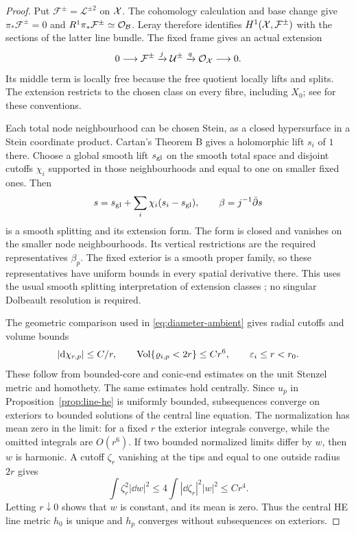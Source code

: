 \begin{proof}
Put $\mathcal F^\pm=\mathcal L^{\pm2}$ on $\mathcal X$.
The cohomology calculation and base change give
$\pi_*\mathcal F^\pm=0$ and $R^1\pi_*\mathcal F^\pm\simeq\mathcal O_{\mathcal B}$.
Leray therefore identifies $H^1(\mathcal X,\mathcal F^\pm)$ with
the sections of the latter line bundle. The fixed frame gives
an actual extension
\begin{equation}\label{eq:total-extension}
 0\longrightarrow\mathcal F^\pm\xrightarrow{j}
 \mathcal U^\pm\xrightarrow{q}\mathcal O_{\mathcal X}\longrightarrow0.
\end{equation}
Its middle term is locally free because the free quotient
locally lifts and splits. The extension restricts to the
chosen class on every fibre, including $X_0$;
see \cite[Tags 01F2 and 0B3A]{Stacks} for these conventions.

Each total node neighbourhood can be chosen Stein, as a
closed hypersurface in a Stein coordinate product. Cartan's
Theorem B \cite[exposé 18, p.~18-7; exposé 19, Section 5]{Cartan}
gives a holomorphic lift $s_i$ of $1$ there.
Choose a global smooth lift $s_{\rm gl}$ on the smooth total
space and disjoint cutoffs $\chi_i$ supported in those
neighbourhoods and equal to one on smaller fixed ones.
Then
\[
 s=s_{\rm gl}+\sum_i\chi_i(s_i-s_{\rm gl}),\qquad
                      \beta=j^{-1}\bar\partial s
\]
is a smooth splitting and its extension form. The form is
closed and vanishes on the smaller node neighbourhoods.
Its vertical restrictions are the required representatives
$\beta_p$. The fixed exterior is a smooth proper family,
so these representatives have uniform bounds in every
spatial derivative there. This uses the usual smooth
splitting interpretation of extension classes
\cite[Chapter V, Section 14]{Demailly}; no singular
Dolbeault resolution is required.

The geometric comparison used in
\eqref{eq:diameter-ambient} gives radial cutoffs and volume
bounds
\begin{equation}\label{eq:radial-cutoffs}
 |\mathrm d\chi_{r,p}|\le C/r,\qquad
 \operatorname{Vol}\{\varrho_{i,p}<2r\}\le Cr^6,
                         \qquad\varepsilon_i\le r<r_0.
\end{equation}
These follow from bounded-core and conic-end estimates on
the unit Stenzel metric and homothety. The same estimates
hold centrally. Since $u_p$ in
Proposition~\ref{prop:line-he} is uniformly bounded,
subsequences converge on exteriors to bounded solutions of
the central line equation. The normalization has mean zero
in the limit: for a fixed $r$ the exterior integrals
converge, while the omitted integrals are $O(r^6)$.
If two bounded normalized limits differ by $w$, then $w$
is harmonic. A cutoff $\zeta_r$ vanishing at the tips and
equal to one outside radius $2r$ gives
\[
 \int\zeta_r^2|\dd w|^2\le
         4\int|\dd\zeta_r|^2|w|^2\le Cr^4.
\]
Letting $r\downarrow0$ shows that $w$ is constant, and its
mean is zero. Thus the central HE line metric $h_0$ is
unique and $h_p$ converges without subsequences on exteriors.


\end{proof}
